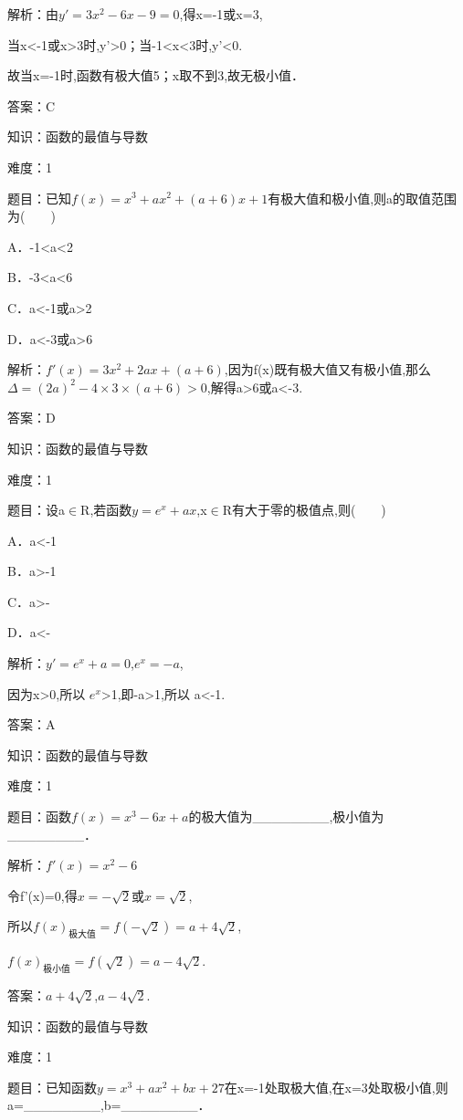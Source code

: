\documentclass{article} %
\begin{document}
解析：由$y'=3x^{2}-6x-9=0$,得x=-1或x=3,

当x<-1或x>3时,y'>0；当-1<x<3时,y'<0.

故当x=-1时,函数有极大值5；x取不到3,故无极小值．

答案：C



知识：函数的最值与导数

难度：1

题目：已知$f(x)=x^{3}+ax^{2}+(a+6)x+1$有极大值和极小值,则a的取值范围为(　　)

A．-1<a<2   

B．-3<a<6

C．a<-1或a>2   

D．a<-3或a>6

解析：$f'(x)=3x^{2}+2ax+(a+6)$,因为f(x)既有极大值又有极小值,那么$\Delta=(2a)^{2}-4\times3\times(a+6)>0$,解得a>6或a<-3.

答案：D



知识：函数的最值与导数

难度：1

题目：设a${\in}$R,若函数$y=e^{x}+ax$,x${\in}$R有大于零的极值点,则(　　)

A．a<-1   

B．a>-1

C．a>-   

D．a<-

解析：$y'=e^{x}+a=0$,$e^{x}=-a$,

因为x>0,所以 $e^{x}$>1,即-a>1,所以 a<-1.

答案：A



知识：函数的最值与导数

难度：1

题目：函数$f(x)=x^{3}-6x+a$的极大值为\_\_\_\_\_\_\_\_,极小值为\_\_\_\_\_\_\_\_．

解析：$f'(x)=x^{2}-6$

令f'(x)=0,得$x=-\sqrt{2}$或$x=\sqrt{2}$,

所以$f(x)_{\textrm{极}\textrm{大}\textrm{值}}=f(-\sqrt{2})=a+4\sqrt{2}$,

$f(x)_{\textrm{极}\textrm{小}\textrm{值}}=f(\sqrt{2})=a-4\sqrt{2}$.

答案：$a+4\sqrt{2}$,$a-4\sqrt{2}$.



知识：函数的最值与导数

难度：1

题目：已知函数$y=x^{3}+ax^{2}+bx+27$在x=-1处取极大值,在x=3处取极小值,则a=\_\_\_\_\_\_\_\_,b=\_\_\_\_\_\_\_\_．
\end{document}
